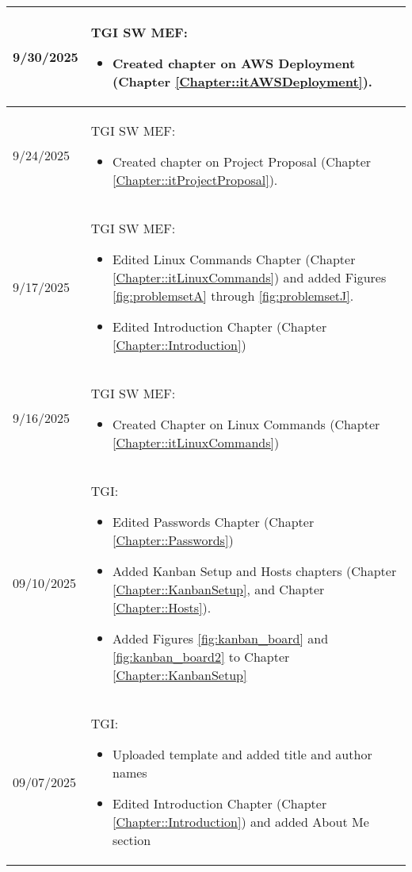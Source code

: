 \begin{longtable}{|l||p{13.5cm}|}
9/30/2025 & TGI SW MEF:
\begin{itemize}[topsep=0pt,itemsep=0pt,parsep=0pt,partopsep=0pt,leftmargin=12pt]
\item Created chapter on AWS Deployment (Chapter \ref{Chapter::itAWSDeployment}).
\end{itemize}
\\ \hline

9/24/2025 & TGI SW MEF:
\begin{itemize}[topsep=0pt,itemsep=0pt,parsep=0pt,partopsep=0pt,leftmargin=12pt]
\item Created chapter on Project Proposal (Chapter \ref{Chapter::itProjectProposal}).
\end{itemize}
\\ \hline

9/17/2025 & TGI SW MEF:
\begin{itemize}[topsep=0pt,itemsep=0pt,parsep=0pt,partopsep=0pt,leftmargin=12pt]
\item Edited Linux Commands Chapter (Chapter \ref{Chapter::itLinuxCommands}) and added Figures \ref{fig:problemsetA} through \ref{fig:problemsetJ}.
\item Edited Introduction Chapter (Chapter \ref{Chapter::Introduction})
\end{itemize} 
\\ \hline

9/16/2025 & TGI SW MEF:
\begin{itemize}[topsep=0pt,itemsep=0pt,parsep=0pt,partopsep=0pt,leftmargin=12pt]
\item Created Chapter on Linux Commands (Chapter \ref{Chapter::itLinuxCommands})
\end{itemize} 
\\ \hline

09/10/2025 & TGI:
\begin{itemize}[topsep=0pt,itemsep=0pt,parsep=0pt,partopsep=0pt,leftmargin=12pt]
\item Edited Passwords Chapter (Chapter \ref{Chapter::Passwords})
\item Added Kanban Setup and Hosts chapters (Chapter \ref{Chapter::KanbanSetup}, and Chapter \ref{Chapter::Hosts}).
\item Added Figures \ref{fig:kanban_board} and \ref{fig:kanban_board2} to Chapter \ref{Chapter::KanbanSetup}
\end{itemize} 
\\ \hline

09/07/2025 & TGI:
\begin{itemize}[topsep=0pt,itemsep=0pt,parsep=0pt,partopsep=0pt,leftmargin=12pt]
\item Uploaded template and added title and author names
\item Edited Introduction Chapter (Chapter \ref{Chapter::Introduction}) and added About Me section
\end{itemize} 
\\ \hline



\end{longtable}



